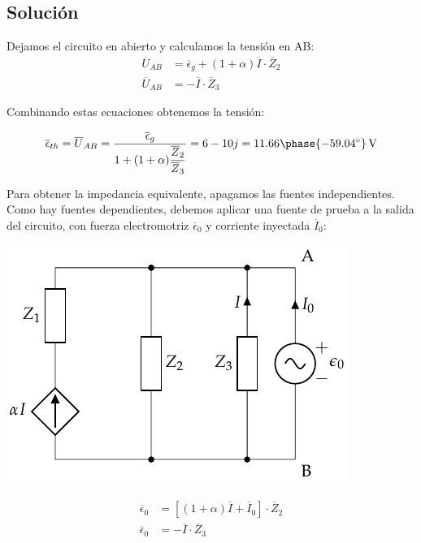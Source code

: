 \subsection*{Solución}

Dejamos el circuito en abierto y calculamos la tensión en AB:
\begin{align*}
  \overline{U}_{AB} &= \overline{\epsilon}_g + (1 + \alpha) \overline{I} \cdot \overline{Z}_2\\[3pt]
  \overline{U}_{AB} &= - \overline{I} \cdot \overline{Z}_3
\end{align*}

Combinando estas ecuaciones obtenemos la tensión:

\begin{equation*}
  \overline{\epsilon}_{th} = \overline{U}_{AB} = \frac{\overline{\epsilon}_g}{1 + (1 + \alpha) \dfrac{\overline{Z}_2}{\overline{Z}_3}} = 6 - 10j = 11.66\phase{\ang{-59.04}}\,\si{\volt}
\end{equation*}

Para obtener la impedancia equivalente, apagamos las fuentes independientes. Como hay fuentes dependientes, debemos aplicar una fuente de prueba a la salida del circuito, con fuerza electromotriz $\overline{\epsilon}_0$ y corriente inyectada $\overline{I}_0$:

\begin{minipage}{0.5\linewidth}
  \begin{center}
    \includegraphics{figuras/Thevenin4_fuenteprueba}
  \end{center}
\end{minipage}
\begin{minipage}{0.5\linewidth}
  \begin{align*}
    \overline{\epsilon}_0 &= [(1 + \alpha) \overline{I} + \overline{I}_0] \cdot \overline{Z}_2\\[3pt]
    \overline{\epsilon}_0 &= - \overline{I}\cdot \overline{Z}_3
  \end{align*}
\end{minipage}

